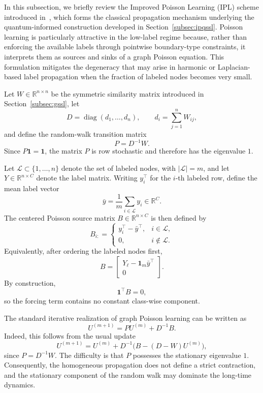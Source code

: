 \documentclass[11pt,a4paper]{article}
\begin{document}
In this subsection, we briefly review the Improved Poisson Learning (IPL)
scheme introduced in~\cite{bozorgnia2026improved}, which forms the classical
propagation mechanism underlying the quantum-informed construction developed
in Section~\ref{subsec:ipqssl}. Poisson learning is particularly attractive in the low-label regime because, rather than enforcing the available labels
through pointwise boundary-type constraints, it interprets them as sources and sinks of a graph Poisson equation. This formulation mitigates the degeneracy that may arise in harmonic or Laplacian-based label propagation when the fraction of labeled nodes becomes very small.

Let \(W\in\mathbb{R}^{n\times n}\) be the symmetric similarity matrix introduced
in Section~\ref{subsec:gssl}, let
\[
D=\operatorname{diag}(d_1,\ldots,d_n),
\qquad
d_i=\sum_{j=1}^{n}W_{ij},
\]
and define the random-walk transition matrix
\[
P=D^{-1}W.
\]
Since \(P\mathbf{1}=\mathbf{1}\), the matrix \(P\) is row stochastic and therefore
has the eigenvalue \(1\).

Let \(\mathcal{L}\subset\{1,\ldots,n\}\) denote the set of labeled nodes,
with \(|\mathcal{L}|=m\), and let
\(Y\in\mathbb{R}^{n\times C}\) denote the label matrix. Writing
\(y_i^\top\) for the \(i\)-th labeled row, define the mean label vector
\[
\bar y
=
\frac{1}{m}
\sum_{i\in\mathcal{L}} y_i
\in\mathbb{R}^{C}.
\]
The centered Poisson source matrix
\(B\in\mathbb{R}^{n\times C}\) is then defined by
\begin{equation}
B_{i:}
=
\begin{cases}
y_i^\top-\bar y^\top, & i\in\mathcal{L},\\[1mm]
0, & i\notin\mathcal{L}.
\end{cases}
\label{eq:ipl_source}
\end{equation}
Equivalently, after ordering the labeled nodes first,
\[
B=
\begin{bmatrix}
Y_{\ell}-\mathbf{1}_{m}\bar y^\top\\
0
\end{bmatrix}.
\]
By construction,
\begin{equation}
\mathbf{1}^{\top}B=0,
\label{eq:centered_source}
\end{equation}
so the forcing term contains no constant class-wise component.

The standard iterative realization of graph Poisson learning can be written as
\begin{equation}
U^{(m+1)}
=
P U^{(m)}
+
D^{-1}B.
\label{eq:standard_poisson_iteration}
\end{equation}
Indeed, this follows from the usual update
\[
U^{(m+1)}
=
U^{(m)}
+
D^{-1}
\bigl(
B-(D-W)U^{(m)}
\bigr),
\]
since \(P=D^{-1}W\). The difficulty is that \(P\) possesses the stationary
eigenvalue \(1\). Consequently, the homogeneous propagation does not define
a strict contraction, and the stationary component of the random walk may
dominate the long-time dynamics.
\end{document}
